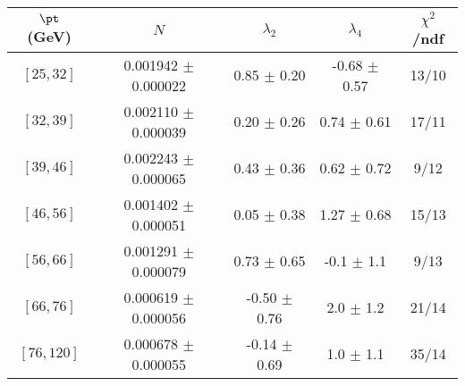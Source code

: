 \begin{tabular}{c||c|c|c|c}
$\pt$ (GeV) & $N$ & $\lambda_{2}$ & $\lambda_4$  & $\chi^2$/ndf  \\
\hline
$[25, 32]$ & 0.001942 $\pm$ 0.000022 & 0.85 $\pm$ 0.20 & -0.68 $\pm$ 0.57 & 13/10\\
$[32, 39]$ & 0.002110 $\pm$ 0.000039 & 0.20 $\pm$ 0.26 & 0.74 $\pm$ 0.61 & 17/11\\
$[39, 46]$ & 0.002243 $\pm$ 0.000065 & 0.43 $\pm$ 0.36 & 0.62 $\pm$ 0.72 & 9/12\\
$[46, 56]$ & 0.001402 $\pm$ 0.000051 & 0.05 $\pm$ 0.38 & 1.27 $\pm$ 0.68 & 15/13\\
$[56, 66]$ & 0.001291 $\pm$ 0.000079 & 0.73 $\pm$ 0.65 & -0.1 $\pm$ 1.1 & 9/13\\
$[66, 76]$ & 0.000619 $\pm$ 0.000056 & -0.50 $\pm$ 0.76 & 2.0 $\pm$ 1.2 & 21/14\\
$[76, 120]$ & 0.000678 $\pm$ 0.000055 & -0.14 $\pm$ 0.69 & 1.0 $\pm$ 1.1 & 35/14\\
\end{tabular}

